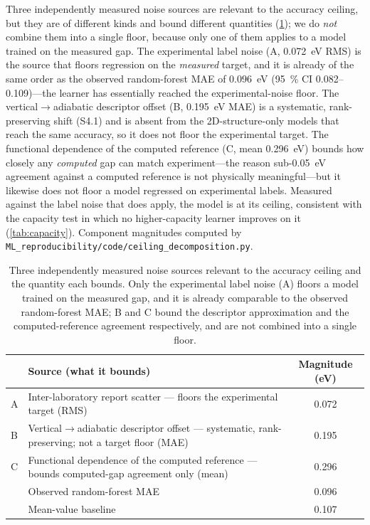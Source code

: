 \documentclass[twoside,twocolumn,9pt]{extarticle}
\begin{document}
Three independently measured noise sources are relevant to the accuracy ceiling, but
they are of different kinds and bound different quantities (\cref{tab:ceiling}); we do
\emph{not} combine them into a single floor, because only one of them applies to a model
trained on the measured gap. The experimental label noise (A, \qty{0.072}{\electronvolt}
RMS) is the source that floors regression on the \emph{measured} target, and it is already
of the same order as the observed random-forest MAE of \qty{0.096}{\electronvolt}
(\qty{95}{\percent} CI \numrange{0.082}{0.109})---the learner has essentially reached the
experimental-noise floor. The vertical$\rightarrow$adiabatic descriptor offset (B,
\qty{0.195}{\electronvolt} MAE) is a systematic, rank-preserving shift (S4.1) and is absent
from the 2D-structure-only models that reach the same accuracy, so it does not floor the
experimental target. The functional dependence of the computed reference (C, mean
\qty{0.296}{\electronvolt}) bounds how closely any \emph{computed} gap can match
experiment---the reason sub-\qty{0.05}{\electronvolt} agreement against a computed
reference is not physically meaningful---but it likewise does not floor a model regressed
on experimental labels. Measured against the label noise that does apply, the model is at
its ceiling, consistent with the capacity test in which no higher-capacity learner improves
on it (\cref{tab:capacity}). Component magnitudes computed by
\texttt{ML\_reproducibility/code/ceiling\_decomposition.py}.

\begin{table}[htbp]
  \centering
  \caption{Three independently measured noise sources relevant to the accuracy ceiling and
    the quantity each bounds. Only the experimental label noise (A) floors a model trained
    on the measured gap, and it is already comparable to the observed random-forest MAE;
    B and C bound the descriptor approximation and the computed-reference agreement
    respectively, and are not combined into a single floor.}
  \label{tab:ceiling}
  \small
  \begin{tabular}{p{}p{}c}
    \toprule
    & Source (what it bounds) & Magnitude (eV) \\
    \midrule
    A & Inter-laboratory report scatter --- floors the experimental target (RMS) & 0.072 \\
    B & Vertical$\rightarrow$adiabatic descriptor offset --- systematic, rank-preserving; not a target floor (MAE) & 0.195 \\
    C & Functional dependence of the computed reference --- bounds computed-gap agreement only (mean) & 0.296 \\
    \midrule
    & Observed random-forest MAE & 0.096 \\
    & Mean-value baseline & 0.107 \\
    \bottomrule
  \end{tabular}
\end{table}
\end{document}
